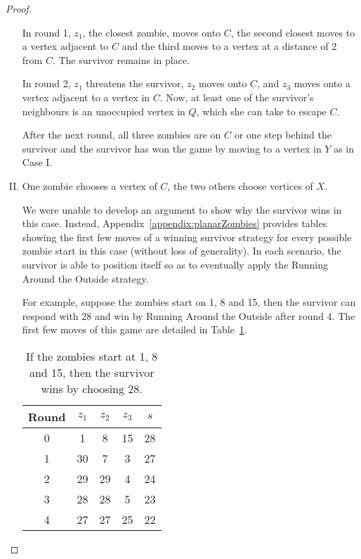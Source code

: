 \begin{proof}
\begin{enumerate}[I.]
In round 1, $z_1$, the closest zombie, moves onto $C$, the second closest moves to a vertex adjacent to $C$ and the third
moves to a vertex at a distance of 2 from $C$. The survivor remains in place.

In round 2, $z_1$ threatens the survivor, $z_2$ moves onto $C$, and $z_3$ moves onto a vertex adjacent to a vertex in $C$. Now, at least one of the survivor's neighbours is an unoccupied vertex in $Q$, which she can take to escape $C$.

After the next round, all three zombies are on $C$ or one step behind the survivor and the survivor has won the game by moving to a vertex in $Y$
as in Case I.

\item One zombie chooses a vertex of $C$, the two others choose vertices of $X$.\label{planar case 4}

We were unable to develop an argument to show why the survivor wins in this case.
Instead, Appendix~\ref{appendix:planarZombies} provides tables showing the first few moves of a winning survivor strategy
for every possible zombie start in this case (without loss of generality). In each scenario, the survivor is able to position itself so as to eventually apply the Running Around the Outside strategy.

For example, suppose the zombies start on 1, 8 and 15, then the survivor can respond with 28 and win by Running Around the Outside after round 4. The first few moves of this game are detailed in Table~\ref{table start 1 8 15}.
\begin{table}
\begin{tabular}{c | c | c | c | c }
Round & $z_1$ & $z_2$ & $z_3$ & $s$ \\
\hline
0 & 1 & 8 & 15 & 28 \\
1 & 30 & 7 & 3 & 27 \\
2 & 29 & 29 & 4 & 24 \\
3 & 28 & 28 & 5 & 23 \\
4 & 27 & 27 & 25 & 22 \\
\end{tabular}
\caption{If the zombies start at 1, 8 and 15, then the survivor wins by choosing 28. \label{table start 1 8 15}}
\end{table}

\end{enumerate}
\end{proof}
